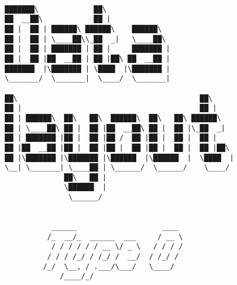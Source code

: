 \documentclass[varwidth=\maxdimen,margin=0.5cm,multi={verbatim}]{standalone}
\begin{document}
\begin{verbatim}

███████\             ██\                              
██  __██\            ██ |                             
██ |  ██ | ██████\ ██████\    ██████\                 
██ |  ██ | \____██\\_██  _|   \____██\                
██ |  ██ | ███████ | ██ |     ███████ |               
██ |  ██ |██  __██ | ██ |██\ ██  __██ |               
███████  |\███████ | \████  |\███████ |               
\_______/  \_______|  \____/  \_______|               
                                                      
██\                                           ██\     
██ |                                          ██ |    
██ | ██████\  ██\   ██\  ██████\  ██\   ██\ ██████\   
██ | \____██\ ██ |  ██ |██  __██\ ██ |  ██ |\_██  _|  
██ | ███████ |██ |  ██ |██ /  ██ |██ |  ██ |  ██ |    
██ |██  __██ |██ |  ██ |██ |  ██ |██ |  ██ |  ██ |██\ 
██ |\███████ |\███████ |\██████  |\██████  |  \████  |
\__| \_______| \____██ | \______/  \______/    \____/ 
              ██\   ██ |                              
              \██████  |                              
               \______/


           ______                    ____                                                                            
          /_  __/_  ______  ___     / __ \
           / / / / / / __ \/ _ \   / / / /
          / / / /_/ / /_/ /  __/  / /_/ / 
         /_/  \__, / .___/\___/   \____/  
             /____/_/



\end{verbatim}
\end{document}
